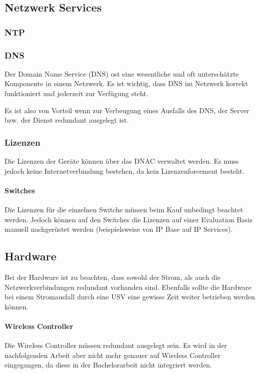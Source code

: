 \subsection{Netzwerk Services}

\subsubsection{NTP}


\subsubsection{DNS}
Der Domain Name Service (DNS) ost eine wesentliche und oft unterschätzte Komponente in einem Netzwerk. Es ist wichtig, dass DNS im Netzwerk korrekt funktioniert und jederzeit zur Verfügung steht.

Es ist also von Vorteil wenn zur Verbeugung eines Ausfalls des DNS, der Server bzw. der Dienst redundant ausgelegt ist.

\subsubsection{Lizenzen}
Die Lizenzen der Geräte können über das DNAC verwaltet werden. Es muss jedoch keine Internetverbindung bestehen, da kein Lizenzenforcement besteht.

\paragraph{Switches}
Die Lizenzen für die einzelnen Switche müssen beim Kauf unbedingt beachtet werden. Jedoch können auf den Switches die Lizenzen auf einer Evaluation Basis manuell nachgerüstet werden (beispielsweise von IP Base auf IP Services).

\subsection{Hardware}
Bei der Hardware ist zu beachten, dass sowohl der Strom, als auch die Netzwerkverbindungen redundant vorhanden sind. Ebenfalls sollte die Hardware bei einem Stromausfall durch eine USV eine gewisse Zeit weiter betrieben werden können.

\paragraph{Wireless Controller}
Die Wireless Controller müssen redundant ausgelegt sein. Es wird in der nachfolgenden Arbeit aber nicht mehr genauer auf Wireless Controller eingegangen, da diese in der Bachelorarbeit nicht integriert werden.

